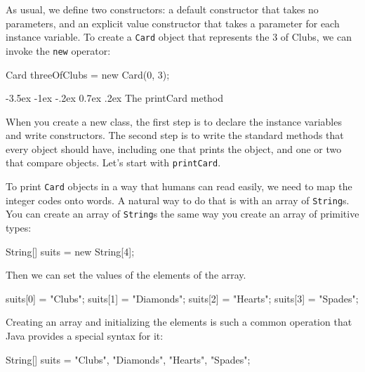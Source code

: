 \documentclass[12pt]{book}
\makeatletter
\renewcommand{\section}{\@startsection {section}{1}{\z@}%
    {-3.5ex \@plus -1ex \@minus -.2ex}%
    {0.7ex \@plus.2ex}%
    {\normalfont\Large\bfseries}}
\theoremstyle{exercise}
\newcommand{\java}[1]{\lstinline{#1}} %
\makeatother
\begin{document}

As usual, we define two constructors: a default constructor that takes no parameters, and an explicit value constructor that takes a parameter for each instance variable.
To create a \java{Card} object that represents the 3 of Clubs, we can invoke the \java{new} operator:

\begin{code}
    Card threeOfClubs = new Card(0, 3);
\end{code}



\section{The printCard method}
\label{printcard}


When you create a new class, the first step is to declare the instance variables and write constructors.
The second step is to write the standard methods that every object should have, including one that prints the object, and one or two that compare objects.
Let's start with \java{printCard}.


To print \java{Card} objects in a way that humans can read easily, we need to map the integer codes onto words.
A natural way to do that is with an array of \java{String}s.
You can create an array of \java{String}s the same way you create an array of primitive types:

\begin{code}
    String[] suits = new String[4];
\end{code}

Then we can set the values of the elements of the array.

\begin{code}
    suits[0] = "Clubs";
    suits[1] = "Diamonds";
    suits[2] = "Hearts";
    suits[3] = "Spades";
\end{code}

Creating an array and initializing the elements is such a common operation that Java provides a special syntax for it:

\begin{code}
    String[] suits = {"Clubs", "Diamonds", "Hearts", "Spades"};
\end{code}

\end{document}
